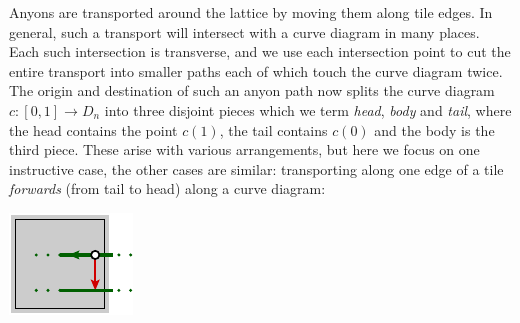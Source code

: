 \documentclass[aps, prl, letterpaper, twocolumn, superscriptaddress, notitlepage, 10pt]{revtex4-1}
\begin{document}
Anyons are transported around the lattice
by moving them along tile edges.
In general, such a transport will intersect with a
curve diagram in many places.
Each such intersection is transverse,
and we use each intersection point to cut
the entire transport into smaller paths each of
which touch the curve diagram twice.
The origin and destination of such an anyon path
now splits the curve diagram $c:[0, 1]\to D_n$ 
into three disjoint pieces which we term
\emph{head}, \emph{body} and \emph{tail}, where
the head contains the point $c(1)$, the tail
contains $c(0)$ and the body is the third piece.
These arise with various arrangements, but here
we focus on one instructive case, the
other cases are similar:
transporting along one edge of a tile \emph{forwards} 
(from tail to head) along a curve diagram:
\begin{center}
\includegraphics[]{pic-move-anyon.pdf}
\end{center}
\end{document}
